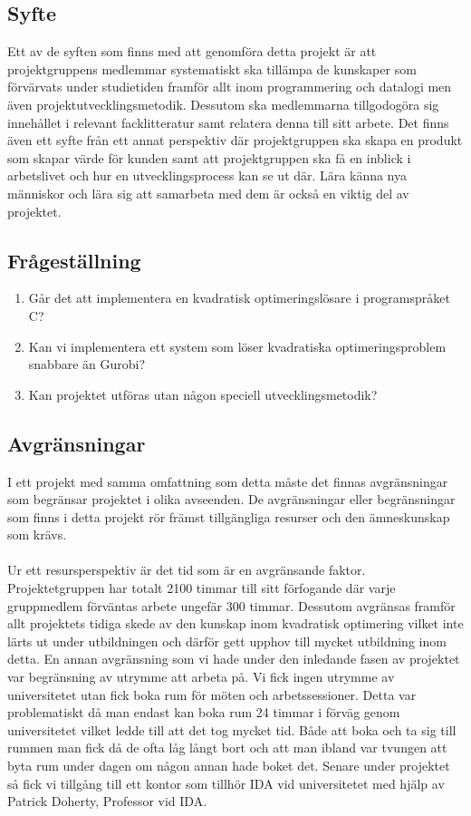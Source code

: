 \subsection{Syfte}
Ett av de syften som finns med att genomföra detta projekt är att projektgruppens medlemmar systematiskt ska tillämpa de kunskaper som förvärvats under studietiden framför allt inom programmering och datalogi men även projektutvecklingsmetodik. Dessutom ska medlemmarna tillgodogöra sig innehållet i relevant facklitteratur samt relatera denna till sitt arbete. 
Det finns även ett syfte från ett annat perspektiv där projektgruppen ska skapa en produkt som skapar värde för kunden samt att projektgruppen ska få en inblick i arbetslivet och hur en utvecklingsprocess kan se ut där. Lära känna nya människor och lära sig att samarbeta med dem är också en viktig del av projektet. 

\subsection{Frågeställning}
	\begin{enumerate}
		\item Går det att implementera en kvadratisk optimeringslösare i programspråket C?
		\item Kan vi implementera ett system som löser kvadratiska optimeringsproblem snabbare än Gurobi?
		\item Kan projektet utföras utan någon speciell utvecklingsmetodik? 
	\end{enumerate}

\subsection{Avgränsningar}
I ett projekt med samma omfattning som detta måste det finnas avgränsningar som begränsar projektet i olika avseenden. De avgränsningar eller begränsningar som finns i detta projekt rör främst tillgängliga resurser och den ämneskunskap som krävs.
\\ \\
Ur ett resursperspektiv är det tid som är en avgränsande faktor. Projektetgruppen har totalt 2100 timmar till sitt förfogande där varje gruppmedlem förväntas arbete ungefär 300 timmar. Dessutom avgränsas framför allt projektets tidiga skede av den kunskap inom kvadratisk optimering vilket inte lärts ut under utbildningen och därför gett upphov till mycket utbildning inom detta.
\newline
\newline
En annan avgränsning som vi hade under den inledande fasen av projektet var begränsning av utrymme att arbeta på. Vi fick ingen utrymme av universitetet utan fick boka rum för möten och arbetssessioner. Detta var problematiskt då man endast kan boka rum 24 timmar i förväg genom universitetet vilket ledde till att det tog mycket tid. Både att boka och ta sig till rummen man fick då de ofta låg långt bort och att man ibland var tvungen att byta rum under dagen om någon annan hade boket det. Senare under projektet så fick vi tillgång till ett kontor som tillhör IDA vid universitetet med hjälp av Patrick Doherty, Professor vid IDA. 